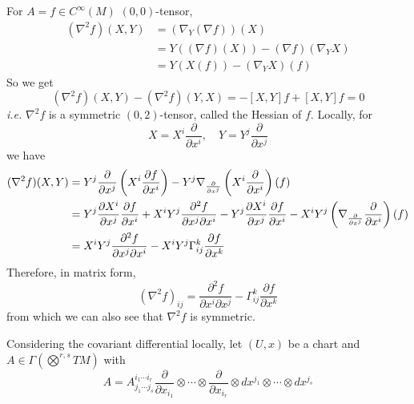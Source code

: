 \begin{exam}[Hessian]
	For $A = f \in C^\infty(M)$ $(0,0)$-tensor,
	\begin{equation*}
		\begin{aligned}
			(\nabla^2f)(X,Y) &=(\nabla_Y(\nabla f))(X) \\
			&= Y((\nabla f)(X)) - (\nabla f)(\nabla_YX) \\
			&= Y(X(f)) - (\nabla_YX)(f)
		\end{aligned}
	\end{equation*}
	So we get
	\begin{equation*}
		(\nabla^2f)(X,Y) - (\nabla^2f)(Y,X) = -[X,Y]f + [X,Y]f = 0
	\end{equation*}
	\emph{i.e.} $\nabla^2f$ is a symmetric $(0,2)$-tensor, called the Hessian of $f$. Locally, for
	\begin{equation*}
		X = X^i\frac{\partial}{\partial x^i},\quad Y = Y^j\frac{\partial}{\partial x^j}
	\end{equation*}
	we have
	\begin{equation*}
		\begin{aligned}
			(\nabla^2f)(X,Y) &= Y^j\frac{\partial}{\partial x^j}\left(X^i\frac{\partial f}{\partial x^i}\right) - Y^j\nabla_{\frac{\partial}{\partial x^j}}\left(X^i\frac{\partial}{\partial x^i}\right)(f) \\
			&= Y^j\frac{\partial X^i}{\partial x^j}\frac{\partial f}{\partial x^i} + X^iY^j\frac{\partial^2 f}{\partial x^j\partial x^i} - Y^j\frac{\partial X^i}{\partial x^j}\frac{\partial f}{\partial x^i} - X^iY^j\left(\nabla_{\frac{\partial}{\partial x^j}}\frac{\partial}{\partial x^i}\right)(f) \\
			&= X^iY^j\frac{\partial^2 f}{\partial x^j\partial x^i} - X^iY^j\Gamma_{ij}^k\frac{\partial f}{\partial x^k}
		\end{aligned}
	\end{equation*}
	Therefore, in matrix form,
	\begin{equation*}
		(\nabla^2f)_{ij} = \frac{\partial^2 f}{\partial x^i\partial x^j} - \Gamma_{ij}^k\frac{\partial f}{\partial x^k}
	\end{equation*}
	from which we can also see that $\nabla^2f$ is symmetric.
\end{exam}
\noindent Considering the covariant differential locally, let $(U,x)$ be a chart and $A \in \Gamma(\bigotimes^{r,s}TM)$ with
\begin{equation*}
	A = A^{i_1 \cdots i_r}_{j_1 \cdots j_s}\frac{\partial}{\partial x_{i_1}}\otimes \cdots \otimes \frac{\partial}{\partial x_{i_r}}\otimes dx^{j_1}\otimes \cdots \otimes dx^{j_s}
\end{equation*}
